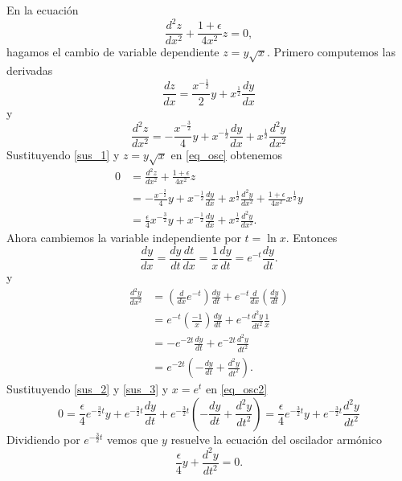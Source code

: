 \begin{demo} En la ecuación 
\begin{equation}\label{eq_osc}\frac{d^2z}{dx^2}+\frac{1+\epsilon}{4x^2}z=0,
\end{equation}
hagamos el cambio de variable dependiente $z=y\sqrt{x}$. Primero computemos las derivadas
\[
\frac{dz}{dx}=\frac{x^{-\frac{1}{2}}}{2}y+x^{\frac{1}{2}}\frac{dy}{dx}
\]
y
\begin{equation}\label{sus_1}
\frac{d^2z}{dx^2}=-\frac{x^{-\frac{3}{2}}}{4}y+ x^{-\frac{1}{2}}\frac{dy}{dx} +x^{\frac{1}{2}}\frac{d^2y}{dx^2}
\end{equation}
Sustituyendo \eqref{sus_1} y  $z=y\sqrt{x}$ en \eqref{eq_osc} obtenemos
\begin{equation}\label{eq_osc2}
\begin{split}
 0&=\frac{d^2z}{dx^2}+\frac{1+\epsilon}{4x^2}z\\
 &=-\frac{x^{-\frac{3}{2}}}{4}y+
x^{-\frac{1}{2}}\frac{dy}{dx} +x^{\frac{1}{2}}\frac{d^2y}{dx^2}+\frac{1+\epsilon}{4x^2}
x^{\frac{1}{2}}y\\
&=\boxed{\frac{\epsilon}{4}x^{-\frac{3}{2}}y+ x^{-\frac{1}{2}}\frac{dy}{dx} +x^{\frac{1}{2}}\frac{d^2y}{dx^2}}.
\end{split}
\end{equation}
Ahora cambiemos la variable independiente por $t=\ln x$. Entonces
\begin{equation}\label{sus_2}\frac{dy}{dx}=\frac{dy}{dt}\frac{dt}{dx}=\frac{1}{x}\frac{dy}{dt}=\boxed{
e^{-t}\frac{dy}{dt}}.
\end{equation}
y
\begin{equation}\label{sus_3}
\begin{split}
\frac{d^2y}{dx^2}&=\left(\frac{d}{dx}e^{-t}\right)\frac{dy}{dt}+
e^{-t}\frac{d}{dx}\left(\frac{dy}{dt}\right)\\
&=e^{-t}\left(\frac{-1}{x}\right)\frac{dy}{dt}+
e^{-t}\frac{d^2y}{dt^2}\frac{1}{x}\\
&=-e^{-2t}\frac{dy}{dt}+
e^{-2t}\frac{d^2y}{dt^2}\\
&=\boxed{e^{-2t}\left(-\frac{dy}{dt}+
\frac{d^2y}{dt^2}\right)}.
\end{split}
\end{equation}
Sustituyendo \eqref{sus_2} y \eqref{sus_3} y $x=e^t$ en \eqref{eq_osc2}
\[
0=\frac{\epsilon}{4}e^{-\frac{3}{2}t}y+e^{-\frac{3}{2}t}\frac{dy}{dt}+e^{-\frac{3}{2}t}\left(-\frac{dy}{dt}+
\frac{d^2y}{dt^2}\right)=\frac{\epsilon}{4}e^{-\frac{3}{2}t}y+e^{-\frac{3}{2}t}\frac{d^2y}{dt^2}
\]
Dividiendo por $e^{-\frac{3}{2}t}$ vemos que $y$ resuelve la ecuación del oscilador armónico
\begin{equation}\label{osc_fin}
\boxed{\frac{\epsilon}{4}y+\frac{d^2y}{dt^2}=0}.
\end{equation}


\end{demo}
